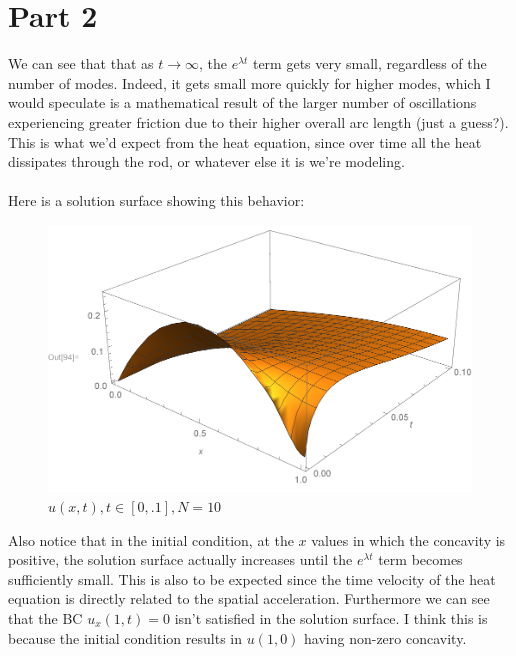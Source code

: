 \documentclass{article}
\begin{document}
\section*{Part 2}
We can see that that as $t \to \infty$, the $e^{\lambda t}$ term gets very small, regardless of the number of modes. Indeed, it gets small more quickly for higher modes, which I would speculate is a mathematical result of the larger number of oscillations experiencing greater friction due to their higher overall arc length (just a guess?). This is what we'd expect from the heat equation, since over time all the heat dissipates through the rod, or whatever else it is we're modeling. \\
\\
Here is a solution surface showing this behavior:
\begin{figure}[H]
  \centering
    \includegraphics[width=\textwidth]{part2_plot.pdf}
    \caption{$u(x,t), t \in [0,.1], N = 10$}
\end{figure}
\noindent Also notice that in the initial condition, at the $x$ values in which the concavity is positive, the solution surface actually increases until the $e^{\lambda t}$ term becomes sufficiently small. This is also to be expected since the time velocity of the heat equation is directly related to the spatial acceleration. Furthermore we can see that the BC $u_x(1, t) = 0$ isn't satisfied in the solution surface. I think this is because the initial condition results in $u(1, 0)$ having non-zero concavity.
\end{document}
